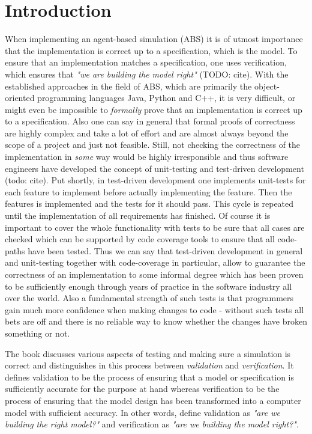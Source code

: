 \section{Introduction}
When implementing an agent-based simulation (ABS) it is of utmost importance that the implementation is correct up to a specification, which is the model. To ensure that an implementation matches a specification, one uses verification, which ensures that \textit{"we are building the model right"} (TODO: cite). With the established approaches in the field of ABS, which are primarily the object-oriented programming languages Java, Python and C++, it is very difficult, or might even be impossible to \textit{formally} prove that an implementation is correct up to a specification. Also one can say in general that formal proofs of correctness are highly complex and take a lot of effort and are almost always beyond the scope of a project and just not feasible. Still, not checking the correctness of the implementation in \textit{some} way would be highly irresponsible and thus software engineers have developed the concept of unit-testing and test-driven development (todo: cite). Put shortly, in test-driven development one implements unit-tests for each feature to implement before actually implementing the feature. Then the features is implemented and the tests for it should pass. This cycle is repeated until the implementation of all requirements has finished. Of course it is important to cover the whole functionality with tests to be sure that all cases are checked which can be supported by code coverage tools to ensure that all code-paths have been tested.
Thus we can say that test-driven development in general and unit-testing together with code-coverage in particular, allow to guarantee the correctness of an implementation to some informal degree which has been proven to be sufficiently enough through years of practice in the software industry all over the world. Also a fundamental strength of such tests is that programmers gain much more confidence when making changes to code - without such tests all bets are off and there is no reliable way to know whether the changes have broken something or not.

The book \cite{robinson_simulation:_2014} discusses various aspects of testing and making sure a simulation is correct and distinguishes in this process between \textit{validation} and \textit{verification}. It defines validation to be the process of ensuring that a model or specification is sufficiently accurate for the purpose at hand whereas verification to be the process of ensuring that the model design has been transformed into a computer model with sufficient accuracy. In other words, \cite{balci_verification_1998} define validation as \textit{"are we building the right model?"} and verification as \textit{"are we building the model right?"}.


